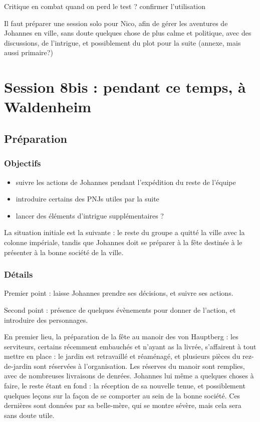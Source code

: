 \documentclass[10pt,a4paper]{book}
\begin{document}
Critique en combat quand on perd le test ? confirmer l'utilisation

Il faut préparer une session solo pour Nico, afin de gérer les aventures de Johannes en ville, sans doute quelques chose de plus calme et politique, avec des discussions, de l'intrigue, et possiblement du plot pour la suite (annexe, mais aussi primaire?)
\section{Session 8bis : pendant ce temps, à Waldenheim}
\subsection{Préparation}
\subsubsection{Objectifs}
\begin{itemize}
\item suivre les actions de Johannes pendant l'expédition du reste de l'équipe
\item introduire certains des PNJs utiles par la suite
\item lancer des éléments d'intrigue supplémentaires ?
\end{itemize}
La situation initiale est la suivante : le reste du groupe a quitté la ville avec la colonne impériale, tandis que Johannes doit se préparer à la fête destinée à le présenter à la bonne société de la ville.
\subsubsection{Détails}
Premier point : laisse Johannes prendre ses décisions, et suivre ses actions.

Second point : présence de quelques évènements pour donner de l'action, et introduire des personnages. 

En premier lieu, la préparation de la fête au manoir des von Hauptberg : les serviteurs, certains récemment embauchés et n'ayant as la livrée, s'affairent à tout mettre en place : le jardin est retravaillé et réaménagé, et plusieurs pièces du rez-de-jardin sont réservées à l'organisation. Les réserves du manoir sont remplies, avec de nombreuses livraisons de denrées. Johannes lui même a quelques choses à faire, le reste étant en fond : la réception de sa nouvelle tenue, et possiblement quelques leçons sur la façon de se comporter au sein de la bonne société. Ces dernières sont données par sa belle-mère, qui se montre sévère, mais cela sera sans doute utile.
\end{document}
